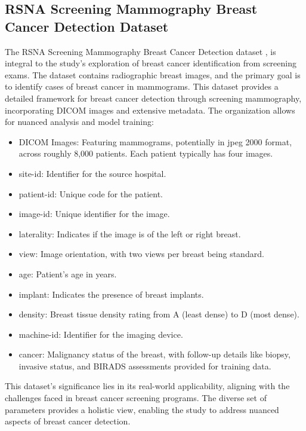 \subsection{RSNA Screening Mammography Breast Cancer Detection Dataset}
The RSNA Screening Mammography Breast Cancer Detection dataset \cite{RSNA}, is integral to the study's exploration of breast cancer identification from screening exams. The dataset contains radiographic breast images, and the primary goal is to identify cases of breast cancer in mammograms. This dataset provides a detailed framework for breast cancer detection through screening mammography, incorporating DICOM images and extensive metadata. The organization allows for nuanced analysis and model training:

\begin{itemize}
  \item DICOM Images: Featuring mammograms, potentially in jpeg 2000 format, across roughly 8,000 patients. Each patient typically has four images.
  \item site-id: Identifier for the source hospital.
  \item patient-id: Unique code for the patient.
  \item image-id: Unique identifier for the image.
  \item laterality: Indicates if the image is of the left or right breast.
  \item view: Image orientation, with two views per breast being standard.
  \item age: Patient's age in years.
  \item implant: Indicates the presence of breast implants.
  \item density: Breast tissue density rating from A (least dense) 
  to D (most dense).
  \item machine-id: Identifier for the imaging device.
  \item cancer: Malignancy status of the breast, with follow-up details 
  like biopsy, invasive status, and BIRADS assessments provided for training data.

\end{itemize}
This dataset's significance lies in its real-world applicability, aligning with the challenges faced in breast cancer screening programs. The diverse set of parameters provides a holistic view, enabling the study to address nuanced aspects of breast cancer detection.
